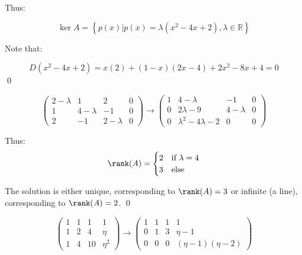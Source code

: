 \documentclass[12pt]{article}
\begin{document}
Thus:

\begin{equation}
    \ker{A} = \left\{ p(x) \vert p(x) = \lambda(x^{2} - 4x + 2), \lambda \in \mathbb{R} \right\}
\end{equation}


Note that:

\begin{equation}
    D \left( x^{2} - 4x + 2 \right) = x(2) + (1 - x)(2x - 4) + 2x^{2} - 8x + 4 = 0
\end{equation}
\qed




\begin{equation}
    \left( \begin{array}{ccc|c}
        2 - \lambda & 1           & 2           & 0 \\
        1           & 4 - \lambda & -1          & 0 \\
        2           & -1          & 2 - \lambda & 0
    \end{array} \right)
    \to
    \left( \begin{array}{ccc|ccc}
        1 & 4 - \lambda                & -1          & 0 \\
        0 & 2\lambda - 9               & 4 - \lambda & 0 \\
        0 & \lambda^{2} - 4\lambda - 2 & 0           & 0
    \end{array} \right)
\end{equation}

Thus:
\begin{equation}
    \rank(A) =
    \begin{cases}
        2 & \text{if } \lambda = 4 \\
        3 & \text{else}
    \end{cases}
\end{equation}

The solution is either unique, corresponding to $\rank(A) = 3$ or infinite (a line), corresponding to $\rank(A) = 2$.
\qed



\begin{equation}
    \left( \begin{array}{ccc|c}
        1 & 1 & 1  & 1        \\
        1 & 2 & 4  & \eta     \\
        1 & 4 & 10 & \eta^{2}
    \end{array} \right)
    \to
    \left( \begin{array}{ccc|c}
        1 & 1 & 1 & 1                    \\
        0 & 1 & 3 & \eta - 1             \\
        0 & 0 & 0 & (\eta - 1)(\eta - 2)
    \end{array} \right)
\end{equation}
\end{document}
